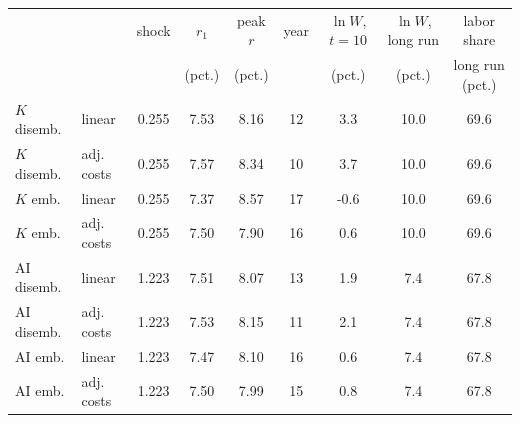 \begin{tabular}{llccccccc}\toprule
 & & shock & $r_1$ & peak $r$ & year & $\ln W$, $t{=}10$ & $\ln W$, long run & labor share\\
 & & & (pct.) & (pct.) & & (pct.) & (pct.) & long run (pct.)\\\midrule
$K$ disemb. & linear & 0.255 & 7.53 & 8.16 & 12 & 3.3 & 10.0 & 69.6\\
$K$ disemb. & adj. costs & 0.255 & 7.57 & 8.34 & 10 & 3.7 & 10.0 & 69.6\\
$K$ emb. & linear & 0.255 & 7.37 & 8.57 & 17 & -0.6 & 10.0 & 69.6\\
$K$ emb. & adj. costs & 0.255 & 7.50 & 7.90 & 16 & 0.6 & 10.0 & 69.6\\
\midrule
AI disemb. & linear & 1.223 & 7.51 & 8.07 & 13 & 1.9 & 7.4 & 67.8\\
AI disemb. & adj. costs & 1.223 & 7.53 & 8.15 & 11 & 2.1 & 7.4 & 67.8\\
AI emb. & linear & 1.223 & 7.47 & 8.10 & 16 & 0.6 & 7.4 & 67.8\\
AI emb. & adj. costs & 1.223 & 7.50 & 7.99 & 15 & 0.8 & 7.4 & 67.8\\
\bottomrule\end{tabular}
